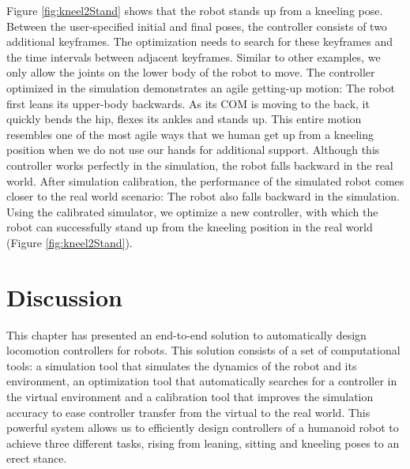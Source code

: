 Figure \ref{fig:kneel2Stand} shows that the robot stands up from a kneeling pose. Between the user-specified initial and final poses, the controller consists of two additional keyframes. The optimization needs to search for these keyframes and the time intervals between adjacent keyframes. Similar to other examples, we only allow the joints on the lower body of the robot to move. The controller optimized in the simulation demonstrates an agile getting-up motion: The robot first leans its upper-body backwards. As its COM is moving to the back, it quickly bends the hip, flexes its ankles and stands up. This entire motion resembles one of the most agile ways that we human get up from a kneeling position when we do not use our hands for additional support. Although this controller works perfectly in the simulation, the robot falls backward in the real world. After simulation calibration, the performance of the simulated robot comes closer to the real world scenario: The robot also falls backward in the simulation. Using the calibrated simulator, we optimize a new controller, with which the robot can successfully stand up from the kneeling position in the real world (Figure \ref{fig:kneel2Stand}).

\section{Discussion}

This chapter has presented an end-to-end solution to automatically design locomotion controllers for robots. This solution consists of a set of computational tools: a simulation tool that simulates the dynamics of the robot and its environment, an optimization tool that automatically searches for a controller in the virtual environment and a calibration tool that improves the simulation accuracy to ease controller transfer from the virtual to the real world. This powerful system allows us to efficiently design controllers of a humanoid robot to achieve three different tasks, rising from leaning, sitting and kneeling poses to an erect stance.


